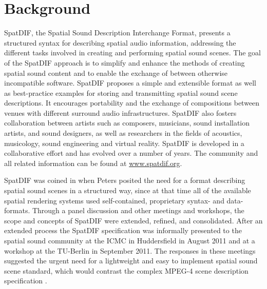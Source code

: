 \documentclass{article}
\title{\papertitle}
\begin{document}
%
\capstartfalse
\maketitle
\capstarttrue
%
\begin{abstract}
The development and specification of SpatDIF, the Spatial Sound Description Interchange Format, is complemented with actual implementations in software in order to become available in various audio software environments.
This article discusses the current state of the development of a software library called `libspatdif', whose purpose is to provide a reference implementation of SpatDIF and demonstrate its best-use practices.
In addition, the design principles derived from the concepts and specifications of SpatDIF, the class structure of the software library, and the concrete implementations demonstrating its usage in computer music applications is presented.
\end{abstract}

\section{Background}\label{sec:Background}

SpatDIF, the Spatial Sound Description Interchange Format, presents a structured syntax for describing spatial audio information, addressing the different tasks involved in creating and performing spatial sound scenes.
The goal of the SpatDIF approach is to simplify and enhance the methods of creating spatial sound content and to enable the exchange of between otherwise incompatible software. 
SpatDIF proposes a simple and extensible format as well as best-practice examples for storing and transmitting spatial sound scene descriptions. 
It encourages portability and the exchange of compositions between venues with different surround audio infrastructures. 
SpatDIF also fosters collaboration between artists such as composers, musicians, sound installation artists, and sound designers, as well as researchers in the fields of acoustics, musicology, sound engineering and virtual reality.
SpatDIF is developed in a collaborative effort and has evolved over a number of years. 
The community and all related information can be found at \url{www.spatdif.org}.%

SpatDIF was coined in \citeyear{peters_caa07} \cite{peters_caa07} when Peters posited the need for a format describing spatial sound scenes in a structured way, since at that time all of the available spatial rendering systems used self-contained, proprietary syntax- and data-formats.
Through a panel discussion \cite{2008ICMCpanel, Peters:2008spatdif} and other meetings and workshops, the scope and concepts of SpatDIF were extended, refined, and consolidated.
After an extended process the SpatDIF specification was informally presented to the spatial sound community at the ICMC in Huddersfield in August 2011 and at a workshop at the TU-Berlin in September 2011.
The responses in these meetings suggested the urgent need for a lightweight and easy to implement spatial sound scene standard, which would contrast the complex MPEG-4 scene description specification \cite{scheirer1999audiobifs}.
\end{document}
